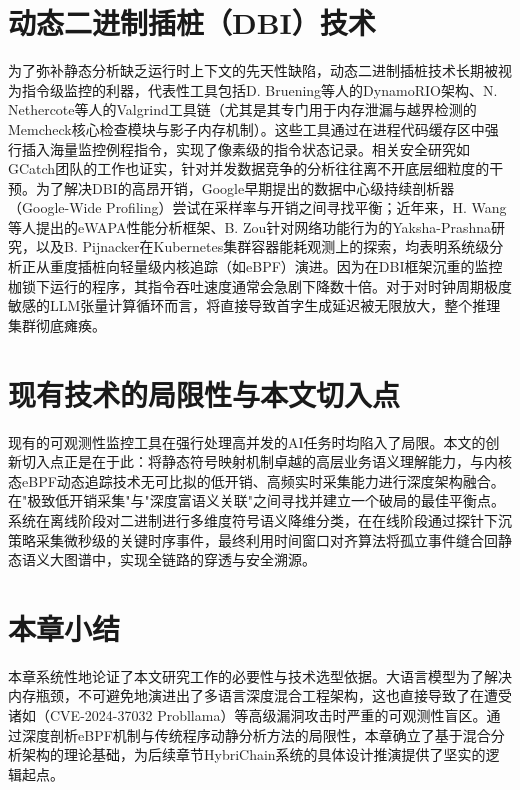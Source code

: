 \section{动态二进制插桩（DBI）技术}

为了弥补静态分析缺乏运行时上下文的先天性缺陷，动态二进制插桩技术长期被视为指令级监控的利器，代表性工具包括D. Bruening等人的DynamoRIO架构、N. Nethercote等人的Valgrind工具链（尤其是其专门用于内存泄漏与越界检测的Memcheck核心检查模块与影子内存机制）。这些工具通过在进程代码缓存区中强行插入海量监控例程指令，实现了像素级的指令状态记录。相关安全研究如GCatch团队的工作也证实，针对并发数据竞争的分析往往离不开底层细粒度的干预。为了解决DBI的高昂开销，Google早期提出的数据中心级持续剖析器（Google-Wide Profiling）尝试在采样率与开销之间寻找平衡；近年来，H. Wang等人提出的eWAPA性能分析框架、B. Zou针对网络功能行为的Yaksha-Prashna研究，以及B. Pijnacker在Kubernetes集群容器能耗观测上的探索，均表明系统级分析正从重度插桩向轻量级内核追踪（如eBPF）演进。因为在DBI框架沉重的监控枷锁下运行的程序，其指令吞吐速度通常会急剧下降数十倍。对于对时钟周期极度敏感的LLM张量计算循环而言，将直接导致首字生成延迟被无限放大，整个推理集群彻底瘫痪。

\section{现有技术的局限性与本文切入点}

现有的可观测性监控工具在强行处理高并发的AI任务时均陷入了局限。本文的创新切入点正是在于此：将静态符号映射机制卓越的高层业务语义理解能力，与内核态eBPF动态追踪技术无可比拟的低开销、高频实时采集能力进行深度架构融合。在"极致低开销采集"与"深度富语义关联"之间寻找并建立一个破局的最佳平衡点。系统在离线阶段对二进制进行多维度符号语义降维分类，在在线阶段通过探针下沉策略采集微秒级的关键时序事件，最终利用时间窗口对齐算法将孤立事件缝合回静态语义大图谱中，实现全链路的穿透与安全溯源。

\section{本章小结}

本章系统性地论证了本文研究工作的必要性与技术选型依据。大语言模型为了解决内存瓶颈，不可避免地演进出了多语言深度混合工程架构，这也直接导致了在遭受诸如（CVE-2024-37032 Probllama）等高级漏洞攻击时严重的可观测性盲区。通过深度剖析eBPF机制与传统程序动静分析方法的局限性，本章确立了基于混合分析架构的理论基础，为后续章节HybriChain系统的具体设计推演提供了坚实的逻辑起点。
